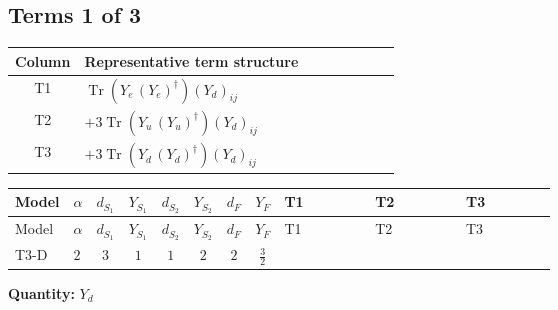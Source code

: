 \documentclass[8pt]{article}
\begin{document}
\begin{landscape}
\subsection*{Terms 1 of 3}
\begin{center}
\begin{tabular}{@{}c >{\raggedright\arraybackslash}p{0.82\linewidth}@{}}
\toprule
Column & Representative term structure \\
\midrule
T1 & \(\displaystyle \operatorname{Tr}\!\left({Y_e}\,\left({Y_e}\right)^{\dagger}\right) \left({Y_d}\right)_{ij}\) \\
\midrule
T2 & \(\displaystyle +3 \operatorname{Tr}\!\left({Y_u}\,\left({Y_u}\right)^{\dagger}\right) \left({Y_d}\right)_{ij}\) \\
\midrule
T3 & \(\displaystyle +3 \operatorname{Tr}\!\left({Y_d}\,\left({Y_d}\right)^{\dagger}\right) \left({Y_d}\right)_{ij}\) \\
\midrule
\bottomrule
\end{tabular}
\end{center}
\smallskip
\tiny
\begin{longtable}{@{}llcccccc >{\raggedright\arraybackslash}p{0.21\linewidth} >{\raggedright\arraybackslash}p{0.21\linewidth} >{\raggedright\arraybackslash}p{0.21\linewidth}@{}}
\toprule
Model & $\alpha$ & $d_{S_1}$ & $Y_{S_1}$ & $d_{S_2}$ & $Y_{S_2}$ & $d_F$ & $Y_F$ & T1 & T2 & T3 \\
\midrule
\endfirsthead
\toprule
Model & $\alpha$ & $d_{S_1}$ & $Y_{S_1}$ & $d_{S_2}$ & $Y_{S_2}$ & $d_F$ & $Y_F$ & T1 & T2 & T3 \\
\midrule
\endhead
T3-D & $2$ & $3$ & $1$ & $1$ & $2$ & $2$ & $\frac{3}{2}$ & \scriptsize\adjustbox{max width=\linewidth}{$\begin{gathered} \operatorname{Tr}\!\left({Y_e}\,\left({Y_e}\right)^{\dagger}\right) \left({Y_d}\right)_{ij}\end{gathered}$} & \scriptsize\adjustbox{max width=\linewidth}{$\begin{gathered} +3 \operatorname{Tr}\!\left({Y_u}\,\left({Y_u}\right)^{\dagger}\right) \left({Y_d}\right)_{ij}\end{gathered}$} & \scriptsize\adjustbox{max width=\linewidth}{$\begin{gathered} +3 \operatorname{Tr}\!\left({Y_d}\,\left({Y_d}\right)^{\dagger}\right) \left({Y_d}\right)_{ij}\end{gathered}$} \\
\midrule
\bottomrule
\end{longtable}
\clearpage
\noindent\textbf{Quantity: }$Y_d$\par\smallskip

\end{landscape}
\end{document}

